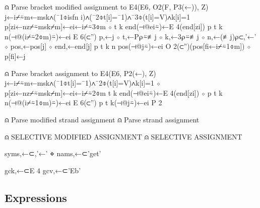 \documentclass{article}%
\begin{document}
⍝ Parse bracket modified assignment to E4(E6, O2(F, P3(←)), Z)
j←i⌿⍨m←msk∧(¯1⌽isfn i)∧(¯2⌽t[i]=¯1)∧¯3⌽(t[i]=V)∧k[i]=1
p[zi←nz⌿⍨msk⌿m]←ei←i⌿⍨3⌽m ⋄ t k end(⊣@ei⍨)←E 4(end[zi])
p t k n(⊣@(i⌿⍨2⌽m)⍨)←ei E 6(⊂'')
p,←j ⋄ t,←P⍴⍨≢j ⋄ k,←3⍴⍨≢j ⋄ n,←(≢j)⍴⊂,'←' ⋄ pos,←pos[j] ⋄ end,←end[j]
p t k n pos(⊣@j⍨)←ei O 2(⊂'')(pos[fi←i⌿⍨1⌽m]) ⋄ p[fi]←j

⍝ Parse bracket assignment to E4(E6, P2(←), Z)
j←i⌿⍨m←msk∧(¯1⌽t[i]=¯1)∧¯2⌽(t[i]=V)∧k[i]=1 ⋄ p[zi←nz⌿⍨msk⌿m]←ei←i⌿⍨2⌽m
t k end(⊣@ei⍨)←E 4(end[zi]) ⋄ p t k n(⊣@(i⌿⍨1⌽m)⍨)←ei E 6(⊂'')
p t k(⊣@j⍨)←ei P 2

⍝ Parse modified strand assignment
⍝ Parse strand assignment

⍝ SELECTIVE MODIFIED ASSIGNMENT
⍝ SELECTIVE ASSIGNMENT
\nwendcode{}\nwdocspar

\nwenddocs{}\plusendmoddef\nwstartdeflinemarkup{}\nwenddeflinemarkup
syms,←⊂,'←' ⋄ nams,←⊂'get'
\nwendcode{}\nwdocspar

\nwenddocs{}\plusendmoddef\nwstartdeflinemarkup{}\nwenddeflinemarkup
gck,←⊂E 4
gcv,←⊂'Eb'
\nwendcode{}\nwdocspar

\subsection{Expressions}
\end{document}
